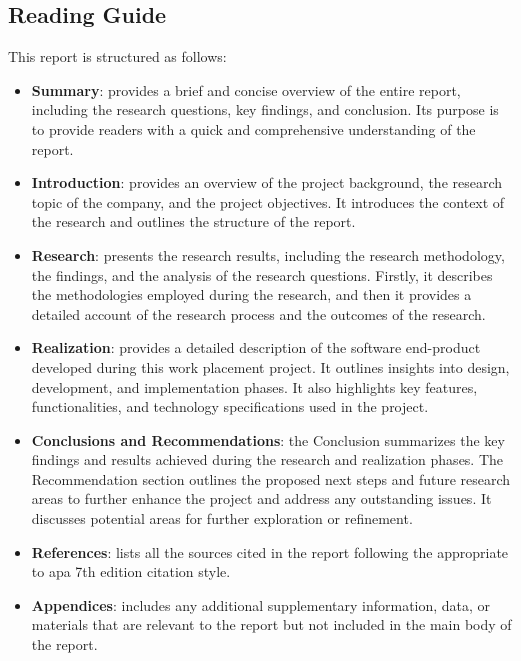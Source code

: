 \begin{multicols}{2}
      \section{Reading Guide}
      This report is structured as follows:
      \begin{itemize}
            \item \textbf{Summary}: provides a brief and concise overview of the entire report, including the
                  research questions, key findings, and conclusion. Its purpose is to provide readers with a
                  quick and comprehensive understanding of the report.
            \item \textbf{Introduction}: provides an overview of the project background, the research topic of the
                  company, and the project objectives. It introduces the context of the research and outlines the
                  structure of the report.
            \item \textbf{Research}: presents the research results, including the research methodology, the findings,
                  and the analysis of the research questions. Firstly, it describes the methodologies employed
                  during the research, and then it provides a detailed account of the research process and the
                  outcomes of the research.
            \item \textbf{Realization}: provides a detailed description of the software end-product developed during
                  this work placement project. It outlines insights into design, development, and implementation
                  phases. It also highlights key features, functionalities, and technology specifications used in
                  the project.
            \item \textbf{Conclusions and Recommendations}: the Conclusion summarizes the key findings and results
                  achieved during the research and realization phases. The Recommendation section outlines the
                  proposed next steps and future research areas to further enhance the project and address any
                  outstanding issues. It discusses potential areas for further exploration or refinement.
            \item \textbf{References}: lists all the sources cited in the report following the appropriate to
                  \acrshort{apa} 7th edition citation style.
            \item \textbf{Appendices}: includes any additional supplementary information, data, or materials that
                  are relevant to the report but not included in the main body of the report.
      \end{itemize}


\end{multicols}

